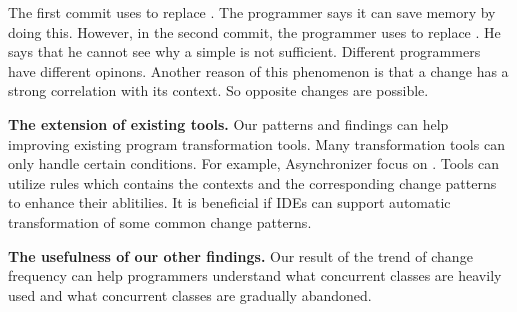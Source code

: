 The first commit uses  to replace . The programmer says it can save memory by doing this. However, in the second commit, the programmer uses  to replace . He says that he cannot see why a simple  is not sufficient. Different programmers have different opinons. Another reason of this phenomenon is that a change has a strong correlation with its context. So opposite changes are possible.

\noindent
\textbf{The extension of existing tools.} Our patterns and findings can help improving existing program transformation tools. Many transformation tools can only handle certain conditions. For example, Asynchronizer \cite{conf/sigsoft/LinRD14} focus on . Tools can utilize rules which contains the contexts and the corresponding change patterns to enhance their ablitilies. It is beneficial if IDEs can support automatic transformation of some common change patterns.

\noindent
\textbf{The usefulness of our other findings.} Our result of the trend of change frequency can help programmers understand what concurrent classes are heavily used and what concurrent classes are gradually abandoned.%
